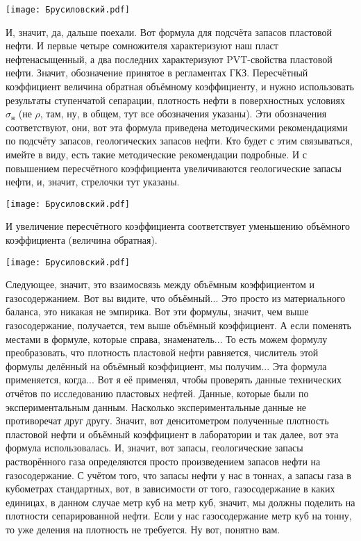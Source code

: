 \documentclass[main.tex]{subfiles}
\begin{document}
\begin{center}
\texttt{[image: Брусиловский.pdf]}
\end{center}

И, значит, да, дальше поехали.
Вот формула для подсчёта запасов пластовой нефти.
И первые четыре сомножителя характеризуют наш пласт нефтенасыщенный, а два последних характеризуют PVT-свойства пластовой нефти.
Значит, обозначение принятое в регламентах ГКЗ.
Пересчётный коэффициент величина обратная объёмному коэффициенту, и нужно использовать результаты ступенчатой сепарации, плотность нефти в поверхностных условиях $\sigma_{\text{н}}$ (не $\rho$, там, ну, в общем, тут все обозначения указаны).
Эти обозначения соответствуют, они, вот эта формула приведена методическими рекомендациями по подсчёту запасов, геологических запасов нефти.
Кто будет с этим связываться, имейте в виду, есть такие методические рекомендации подробные.
И с повышением пересчётного коэффициента увеличиваются геологические запасы нефти, и, значит, стрелочки тут указаны.

\begin{center}
\texttt{[image: Брусиловский.pdf]}
\end{center}

И увеличение пересчётного коэффициента соответствует уменьшению объёмного коэффициента (величина обратная).

\begin{center}
\texttt{[image: Брусиловский.pdf]}
\end{center}

Следующее, значит, это взаимосвязь между объёмным коэффициентом и газосодержанием.
Вот вы видите, что объёмный... Это просто из материального баланса, это никакая не эмпирика.
Вот эти формулы, значит, чем выше газосодержание, получается, тем выше объёмный коэффициент.
А если поменять местами в формуле, которые справа, знаменатель...
То есть можем формулу преобразовать, что плотность пластовой нефти равняется, числитель этой формулы делённый на объёмный коэффициент, мы получим...
Эта формула применяется, когда... Вот я её применял, чтобы проверять данные технических отчётов по исследованию пластовых нефтей.
Данные, которые были по экспериментальным данным.
Насколько экспериментальные данные не противоречат друг другу.
Значит, вот денситометром полученные плотность пластовой нефти и объёмный коэффициент в лаборатории и так далее, вот эта формула использовалась.
И, значит, вот запасы, геологические запасы растворённого газа определяются просто произведением запасов нефти на газосодержание.
С учётом того, что запасы нефти у нас в тоннах, а запасы газа в кубометрах стандартных, вот, в зависимости от того, газосодержание в каких единицах, в данном случае метр куб на метр куб, значит, мы должны поделить на плотности сепарированной нефти.
Если у нас газосодержание метр куб на тонну, то уже деления на плотность не требуется.
Ну вот, понятно вам.
\end{document}

